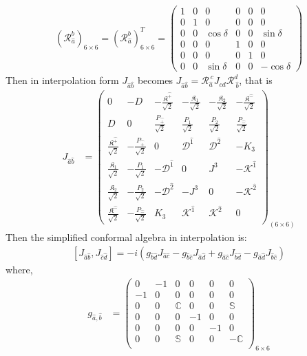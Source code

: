 \documentclass[journal,article,submit,pdftex,moreauthors]{Definitions/mdpi}
\newcommand{\itP}[1]{\hat{#1}}
\begin{document}
\begin{align}
    (\mathcal{R}_{\hat{a}}^{b})_{6\times6}=(\mathcal{R}_{\hat{a}}^{b})^T_{6\times6}=\begin{pmatrix}
    1&0&0&0&0&0\\
    0&1&0&0&0&0\\
    0&0&\cos{\delta}&0&0&\sin{\delta}\\
    0&0&0&1&0&0\\
    0&0&0&0&1&0\\
    0&0&\sin{\delta}&0&0&-\cos{\delta}
    \end{pmatrix}
\end{align}
Then in interpolation form $J_{\hat{a}\hat{b}}$ becomes $J_{\hat{a}\hat{b}}=\mathcal{R}_{\hat{a}}^{~{c}}J_{cd}\mathcal{R}_{~\hat{b}}^{{d}}$, that is
\begin{align}
    J_{\hat{a}\hat{b}}&=\begin{pmatrix}
    0&-D&-\frac{\mathfrak{K}^{\hat{+}}}{\sqrt{2}}&-\frac{\mathfrak{K}_1}{\sqrt{2}}&-\frac{\mathfrak{K}_2}{\sqrt{2}}&-\frac{\mathfrak{K}^{\hat{-}}}{\sqrt{2}}\\
    D&0&\frac{P_{\hat{+}}}{\sqrt{2}}&\frac{P_{1}}{\sqrt{2}}&\frac{P_{2}}{\sqrt{2}}&\frac{P_{\hat{-}}}{\sqrt{2}}\\
    \frac{\mathfrak{K}^{\hat{+}}}{\sqrt{2}}&-\frac{P_{\hat{+}}}{\sqrt{2}}&0 & {\mathcal{D}}^{\itP{1}} & {\mathcal{D}}^{\itP{2}} & -K_3\\
    \frac{\mathfrak{K}_1}{\sqrt{2}}&-\frac{P_{1}}{\sqrt{2}}&-{\mathcal{D}}^{\itP{1}} & 0 & {J}^{3} & -{\mathcal{K}}^{\itP{1}}\\
    \frac{\mathfrak{K}_2}{\sqrt{2}}&-\frac{P_{2}}{\sqrt{2}}&-{\mathcal{D}}^{\itP{2}} & -{J}^{3} & 0 & -{\mathcal{K}}^{\itP{2}}\\
    \frac{\mathfrak{K}^{\hat{-}}}{\sqrt{2}}&-\frac{P_{\hat{-}}}{\sqrt{2}}&K_3 & {\mathcal{K}}^{\itP{1}} & {\mathcal{K}}^{\itP{2}} & 0
  \end{pmatrix}_{(6\times6)}\label{Jhat+hat-}
\end{align}
Then the simplified conformal algebra in interpolation is:
  \begin{align}
      \left[J_{{\hat{a}}{\hat{b}}},J_{{\hat{c}}{\hat{d}}}\right]=-i\left(g_{{\hat{b}}{\hat{d}}}J_{{\hat{a}}{\hat{c}}}-g_{{\hat{b}}{\hat{c}}}J_{{\hat{a}}{\hat{d}}}+g_{{\hat{a}}{\hat{c}}}J_{{\hat{b}}{\hat{d}}}-g_{{\hat{a}}{\hat{d}}}J_{{\hat{b}}{\hat{c}}}\right)\label{simplesrint}
  \end{align}
where, 
\begin{align}
    g_{\hat{a},\hat{b}}&=\begin{pmatrix}
  0&-1&0&0&0&0\\
  -1&0&0&0&0&0\\
  0&0&\mathbb{C}&0&0&\mathbb{S}\\
  0&0&0&-1&0&0\\
  0&0&0&0&-1&0\\
  0&0&\mathbb{S}&0&0&-\mathbb{C}\\
  \end{pmatrix}_{6\times6}\label{metricghat}
\end{align}
\end{document}
